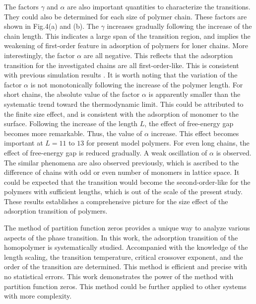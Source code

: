 \documentclass[aps,pre,twocolumn,showpacs,preprintnumbers,amsmath,amssymb]{revtex4-1}
\begin{document}
The factors $\gamma$ and $\alpha$ are also important quantities
to characterize the transitions. They could also be determined for
each size of polymer chain. These factors are shown in Fig.4(a) and (b).
The $\gamma$ increases gradually following the increase of the chain
length. This indicates a large span of the transition region, and implies
the weakening of first-order feature in adsorption of polymers for
loner chains. More interestingly, the factor $\alpha$ are all negative.
This reflects that the adsorption transition for the investigated chains
are all first-order-like. This is consistent with previous simulation
results \cite{PCCP10,JCP09,JCP09b}.
It is worth noting that the variation of the factor $\alpha$ is
not monotonically following the increase of the polymer length.
For short chains, the absolute value of the factor $\alpha$ is apparently
smaller than the systematic trend toward the thermodynamic limit.
This could be attributed to the finite size effect, and is consistent with
the adsorption of monomer to the surface. Following the increase of the
length $L$, the effect of free-energy gap becomes more remarkable. Thus,
the value of $\alpha$ increase. This effect becomes important at $L=11$ to
$13$ for present model polymers. For even long chains, the effect of
free-energy gap is reduced gradually. A weak oscillation of $\alpha$
is observed. The similar phenomena are also observed previously\cite{JCP10b},
which is ascribed to the difference of chains with odd or even number of
monomers in lattice space. It could be expected that the
transition would become the second-order-like for the polymers with
sufficient lengths, which is out of the scale of the present study.
These results establishes a comprehensive picture for the size effect
of the adsorption transition of polymers.



The method of partition function zeros provides a unique way to analyze various
aspects of the phase transition. In this work, the adsorption transition of
the homopolymer is systematically studied. Accompanied with the knowledge
of the length scaling, the transition temperature, critical crossover
exponent, and the order of the transition are determined. This method is
efficient and precise with no statistical errors. This work demonstrates
the power of the method with partition function zeros. This method could
be further applied to other systems with more complexity.
\end{document}
